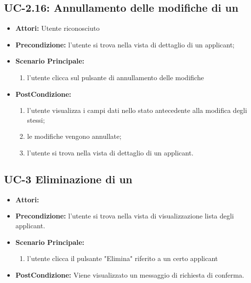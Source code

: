 \subsection{UC-2.16: Annullamento delle modifiche di un \applicant}
\begin{itemize}
	\item \textbf{Attori:} Utente riconosciuto
	\item \textbf{Precondizione:}  l'utente si trova nella vista di dettaglio di un applicant;
	\item \textbf{Scenario Principale:}
	\begin{enumerate}
		\item l'utente clicca sul pulsante di annullamento delle modifiche
	\end{enumerate}
	\item \textbf{PostCondizione:} 
	\begin{enumerate}
		\item l'utente visualizza i campi dati nello stato antecedente alla modifica degli stessi;
		\item le modifiche vengono annullate;
		\item l'utente si trova nella vista di dettaglio di un applicant.
	\end{enumerate}
	
\end{itemize}



\subsection{UC-3 Eliminazione di un\applicant}
\begin{itemize}
\item \textbf{Attori:}\loggedusr
\item \textbf{Precondizione:} l'utente si trova nella vista di visualizzazione lista degli applicant.
\item \textbf{Scenario Principale:}
\begin{enumerate}
	\item l'utente clicca il pulsante "Elimina" riferito a un certo applicant
\end{enumerate}
\item \textbf{PostCondizione:} Viene visualizzato un messaggio di richiesta di conferma.
\end{itemize}

